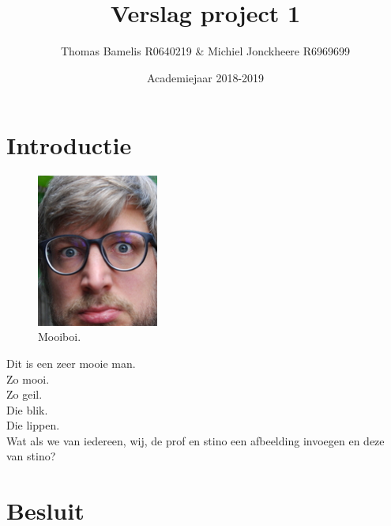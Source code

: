 \documentclass[a4paper,kulak]{kulakarticle}
\date{Academiejaar 2018-2019}
\title{Verslag project 1}
\author{Thomas Bamelis R0640219 \& Michiel Jonckheere R6969699}
\begin{document}
\maketitle

\tableofcontents
\newpage
\section*{Introductie}
\begin{figure}
	\caption{Mooiboi.}
	\label{fig:mooi}
	\includegraphics[width=4cm]{figures/stino.jpg}
\end{figure}
Dit is een zeer mooie man. \\
Zo mooi.\\
Zo geil. \\
Die blik.\\
Die lippen.\\
Wat als we van iedereen, wij, de prof en stino een afbeelding invoegen en deze van stino?

\section*{Besluit}


 
\end{document}
